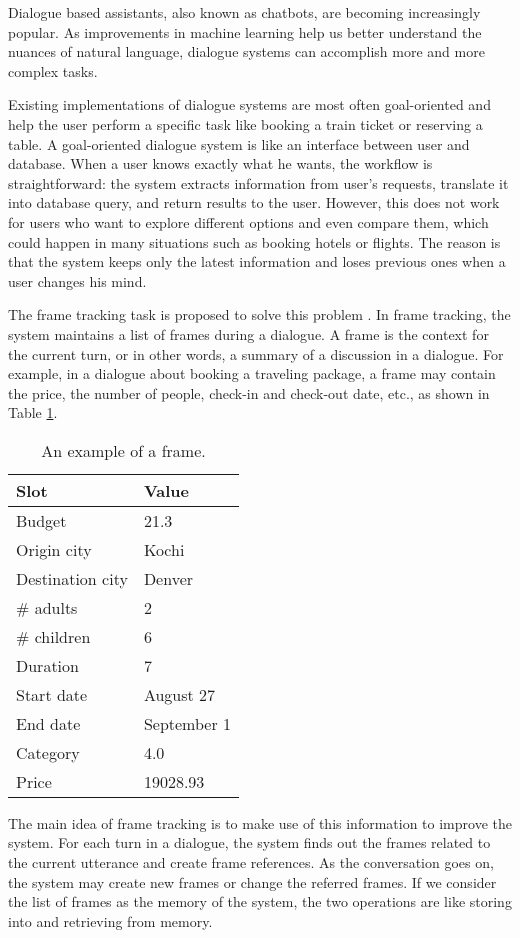 Dialogue based assistants, also known as chatbots, are becoming increasingly popular. As improvements in machine learning help us better understand the nuances of natural language, dialogue systems can accomplish more and more complex tasks. 

Existing implementations of dialogue systems are most often goal-oriented and help the user perform a specific task like booking a train ticket or reserving a table.
A goal-oriented dialogue system is like an interface between user and database. When a user knows exactly what he wants, the workflow is straightforward: the system extracts information from user's requests, translate it into database query, and return results to the user. However, this does not work for users who want to explore different options and even compare them, which could happen in many situations such as booking hotels or flights. The reason is that the system keeps only the latest information and loses previous ones when a user changes his mind.

The frame tracking task is proposed to solve this problem \cite{asri2017frames}. In frame tracking, the system maintains a list of frames during a dialogue. A frame is the context for the current turn, or in other words, a summary of a discussion in a dialogue. For example, in a dialogue about booking a traveling package, a frame may contain the price, the number of people, check-in and check-out date, etc., as shown in Table \ref{tab:ex-frame}.
\begin{table}
    \centering
    \caption[An example of a frame]{An example of a frame.}
    \label{tab:ex-frame}
    \begin{tabular}[t]{ll}
        \toprule
        Slot & Value \\
        \midrule
        Budget & 21.3 \\
        Origin city & Kochi \\
        Destination city & Denver \\
        \# adults & 2 \\
        \# children & 6 \\
        Duration & 7 \\
        Start date & August 27 \\
        End date & September 1 \\
        Category & 4.0 \\
        Price & 19028.93 \\
        \bottomrule
    \end{tabular}
\end{table}
The main idea of frame tracking is to make use of this information to improve the system. For each turn in a dialogue, the system finds out the frames related to the current utterance and create frame references.
As the conversation goes on, the system may create new frames or change the referred frames. If we consider the list of frames as the memory of the system, the two operations are like storing into and retrieving from memory.

